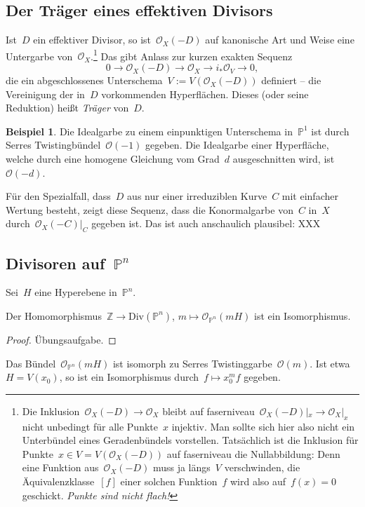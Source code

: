 \documentclass[a4paper,ngerman,12pt]{scrartcl}
\theoremstyle{definition}
\newtheorem{ex}[defn]{Beispiel}
\theoremstyle{plain}
\theoremstyle{remark}
\newcommand{\ZZ}{\mathbb{Z}}
\newcommand{\PP}{\mathbb{P}}
\renewcommand{\O}{\mathcal{O}}
\newcommand{\lra}{\longrightarrow}
\newcommand{\Div}{\mathrm{Div}}
\begin{document}
\subsection*{Der Träger eines effektiven Divisors}

Ist~$D$ ein effektiver Divisor, so ist~$\O_X(-D)$ auf kanonische Art
und Weise eine Untergarbe von~$\O_X$.\footnote{Die Inklusion~$\O_X(-D) \to
\O_X$ bleibt auf faserniveau~$\O_X(-D)|_x \to \O_X|_x$ nicht unbedingt für alle
Punkte~$x$ injektiv. Man sollte sich hier also nicht ein Unterbündel eines 
Geradenbündels vorstellen. Tatsächlich ist die Inklusion für Punkte~$x \in V = V(\O_X(-D))$
auf faserniveau die Nullabbildung: Denn eine Funktion aus~$\O_X(-D)$ muss ja längs~$V$
verschwinden, die Äquivalenzklasse~$[f]$ einer solchen Funktion~$f$ wird also
auf~$f(x) = 0$ geschickt. \emph{Punkte sind nicht flach!}}
Das gibt Anlass zur kurzen exakten Sequenz
\[ 0 \lra \O_X(-D) \lra \O_X \lra i_*\O_V \lra 0, \]
die ein abgeschlossenes Unterschema~$V := V(\O_X(-D))$ definiert -- die Vereinigung
der in~$D$ vorkommenden Hyperflächen. Dieses (oder seine Reduktion) heißt
\emph{Träger} von~$D$.

\begin{ex}Die Idealgarbe zu einem einpunktigen Unterschema in~$\PP^1$ ist durch
Serres Twistingbündel~$\O(-1)$ gegeben. Die Idealgarbe einer Hyperfläche,
welche durch eine homogene Gleichung vom Grad~$d$ ausgeschnitten wird,
ist~$\O(-d)$.
\end{ex}

Für den Spezialfall, dass~$D$ aus nur einer irreduziblen Kurve~$C$ mit
einfacher Wertung besteht, zeigt diese Sequenz, dass die Konormalgarbe von~$C$
in~$X$ durch~$\O_X(-C)|_C$ gegeben ist. Das ist auch anschaulich plausibel: XXX


\subsection*{Divisoren auf~$\PP^n$}

Sei~$H$ eine Hyperebene in~$\PP^n$.

\begin{prop}Der Homomorphismus~$\ZZ \to \Div(\PP^n)$, $m \mapsto \O_{\PP^n}(mH)$ ist
ein Isomorphismus.\end{prop}
\begin{proof}Übungsaufgabe.\end{proof}

Das Bündel~$\O_{\PP^n}(mH)$ ist isomorph zu Serres Twistinggarbe~$\O(m)$. Ist etwa~$H =
V(x_0)$, so ist ein Isomorphismus durch~$f \mapsto x_0^m f$ gegeben.
\end{document}
